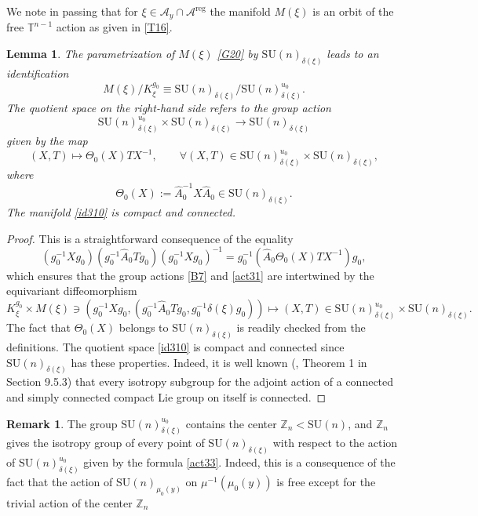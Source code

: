 \documentclass[a4paper,11pt,reqno]{amsart}
\newtheorem{lem}[thm]{Lemma}
\theoremstyle{definition}
\newtheorem{rem}[thm]{Remark}
\numberwithin{equation}{section}
\newcommand{\be}{\begin{equation}}
\newcommand{\ee}{\end{equation}}
\def\cA{{\mathcal A}}                       %
\def\bT{{\mathbb T}}                        %
\def\reg{\mathrm{reg}}                      %
\def\bZ{{\mathbb Z}}                        %
\def\SU{\mathrm{SU}}                        %
\def\reg{\mathrm{reg}}                      %
\begin{document}
We note in passing that for $\xi \in \cA_y \cap \cA^\reg$ the manifold $M(\xi)$ is an orbit of the free $\bT^{n-1}$ action
as given in \eqref{T16}.



\begin{lem}\label{lem310}
The parametrization of $M(\xi)$ \eqref{G20}  by $\SU(n)_{\delta(\xi)}$ leads to an identification
\be
M(\xi)/ K_\xi^{g_0} \equiv \SU(n)_{\delta(\xi)}/ \SU(n)_{\delta(\xi)}^{u_0}.
\label{id310}\ee
The quotient space on the right-hand side refers to the group action
\be
\SU(n)_{\delta(\xi)}^{u_0} \times \SU(n)_{\delta(\xi)} \to \SU(n)_{\delta(\xi)}
\label{act31}\ee
given by the map
\be
(X, T) \mapsto \Theta_0(X) T X^{-1}, \qquad \forall (X,T) \in  \SU(n)^{u_0}_{\delta(\xi)} \times \SU(n)_{\delta(\xi)},
\label{act33}\ee
where
\be
\Theta_0(X) := \hat A_0^{-1} X \hat A_0 \in \SU(n)_{\delta(\xi)}.
\label{G23}\ee
The manifold \eqref{id310} is compact and connected.
\end{lem}
\begin{proof}
This is a straightforward  consequence of the equality
\be
(g_0^{-1} X g_0) (g_0^{-1} \hat A_0 T g_0) (g_0^{-1} X g_0)^{-1} = g_0^{-1} (\hat A_0 \Theta_0(X) T X^{-1}) g_0,
\ee
which ensures that the group actions \eqref{B7}  and \eqref{act31} are intertwined by the equivariant diffeomorphism
\be
K_\xi^{g_0} \times M(\xi) \ni (g_0^{-1} X g_0, (g_0^{-1} \hat A_0 T g_0, g_0^{-1} \delta(\xi) g_0 ))
\mapsto (X, T) \in \SU(n)_{\delta(\xi)}^{u_0} \times \SU(n)_{\delta(\xi)}.
\ee
The fact that $\Theta_0(X)$ belongs to  $\SU(n)_{\delta(\xi)}$ is readily checked from the definitions.
 The quotient space \eqref{id310} is compact and connected since
$\SU(n)_{\delta(\xi)}$ has these properties.   Indeed, it is well known (\cite{Bourbaki}, Theorem 1 in Section 9.5.3)
that every isotropy subgroup for the adjoint action
of a  connected and simply connected compact Lie group on itself is connected.
\end{proof}

\begin{rem}\label{remG9}
The group $\SU(n)_{\delta(\xi)}^{u_0}$ contains the center $\bZ_n < \SU(n)$, and $\bZ_n$ gives the isotropy group
of every point of $\SU(n)_{\delta(\xi)}$ with respect to the action of $\SU(n)_{\delta(\xi)}^{u_0}$ given by
the formula \eqref{act33}. Indeed, this is a consequence of the fact that the action of
$\SU(n)_{\mu_0(y)}$ on $\mu^{-1}(\mu_0(y))$ is free except for the trivial action of the center $\bZ_n$
\end{rem}
\end{document}
